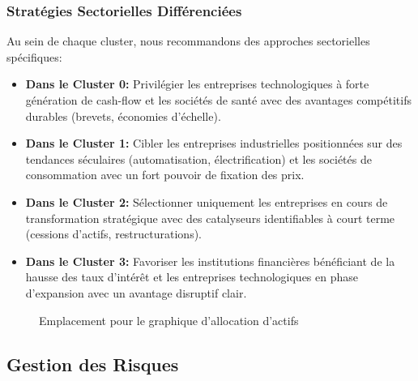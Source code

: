 \documentclass[12pt]{article}
\begin{document}
\subsubsection{Stratégies Sectorielles Différenciées}
Au sein de chaque cluster, nous recommandons des approches sectorielles spécifiques:

\begin{itemize}
    \item \textbf{Dans le Cluster 0:} Privilégier les entreprises technologiques à forte génération de cash-flow et les sociétés de santé avec des avantages compétitifs durables (brevets, économies d'échelle).
    
    \item \textbf{Dans le Cluster 1:} Cibler les entreprises industrielles positionnées sur des tendances séculaires (automatisation, électrification) et les sociétés de consommation avec un fort pouvoir de fixation des prix.
    
    \item \textbf{Dans le Cluster 2:} Sélectionner uniquement les entreprises en cours de transformation stratégique avec des catalyseurs identifiables à court terme (cessions d'actifs, restructurations).
    
    \item \textbf{Dans le Cluster 3:} Favoriser les institutions financières bénéficiant de la hausse des taux d'intérêt et les entreprises technologiques en phase d'expansion avec un avantage disruptif clair.
\end{itemize}

\begin{figure}[H]
    \centering
    \caption{Emplacement pour le graphique d'allocation d'actifs}
    \label{fig:asset_allocation}
\end{figure}

\subsection{Gestion des Risques}
\end{document}
